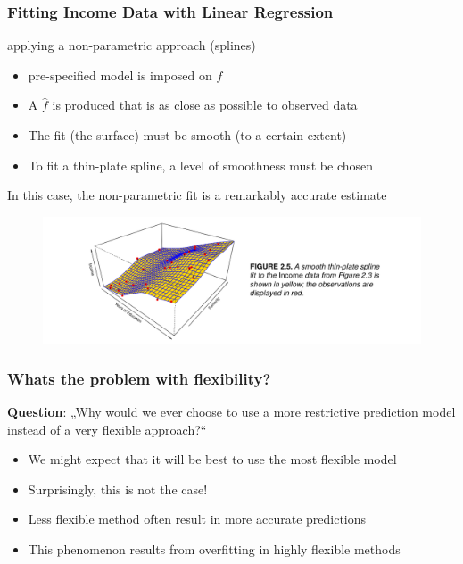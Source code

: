 \documentclass{beamer}
\begin{document}
\begin{frame}
\frametitle{Fitting Income Data with Linear
Regression}
applying a non-parametric approach (splines)
\begin{itemize}
\item pre-specified model is imposed on $f$
\item A $\hat{f}$ is produced that is as close as possible to observed data
\item The fit (the surface) must be smooth (to a certain extent)
\item To fit a thin-plate spline, a level of smoothness must be chosen
\end{itemize} 
In this case, the non-parametric fit is a remarkably accurate estimate
\begin{figure}
\includegraphics[width = 1.1\linewidth]{figures/03/figure_2_5.png}
\end{figure}

\end{frame}

\begin{frame}
\frametitle{Whats the problem with flexibility?}
\textbf{Question}:
„Why‪ would ‪we‪ ever‪ choose‪ to‪ use‪ a ‪more ‪restrictive‪
prediction‪ model ‪instead ‪of ‪a‪ very ‪flexible‪ approach?“
\newline
\begin{itemize}
\item We might expect that it will be best to use the most flexible model 
\item Surprisingly, this is not the case!
\item Less flexible method often result in more accurate predictions
\item This phenomenon results from overfitting in highly flexible methods
\end{itemize}
\end{frame}
\end{document}
